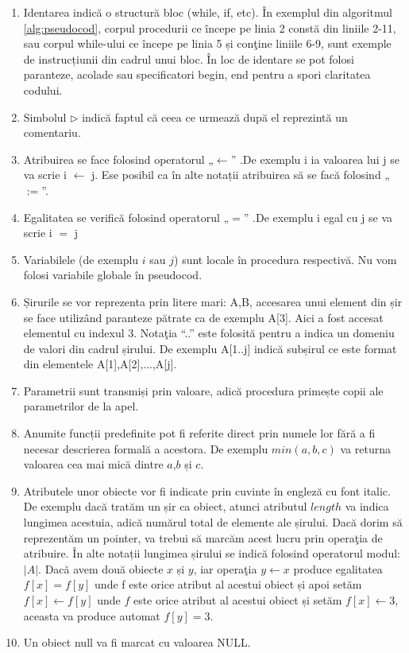 \begin{enumerate}
\item {
	Identarea indică o structură bloc (while, if, etc). În exemplul din algoritmul \ref{alg:pseudocod}, corpul procedurii ce
	începe pe linia 2 constă din liniile 2-11, sau corpul while-ului ce începe pe linia 5 și conţine
	liniile 6-9, sunt exemple de instrucțiunii din cadrul unui bloc.
	În loc de identare se pot folosi paranteze, acolade sau specificatori begin, end pentru a spori claritatea codului.
}
\item {
	Simbolul $\rhd$ indică faptul că ceea ce urmează după el reprezintă un comentariu.
}
\item {
	Atribuirea se face folosind operatorul „$\leftarrow$” .De exemplu i ia valoarea lui j se va scrie i $\leftarrow$ j. Ese posibil ca în alte notații atribuirea să se facă folosind „$:=$”.
}
\item {
	Egalitatea se verifică folosind operatorul „$=$” .De exemplu i egal cu j se va scrie i $=$ j
}
\item {
	Variabilele (de exemplu $i$ sau $j$) sunt locale în procedura respectivă. Nu vom folosi variabile globale în pseudocod.
}
\item {
	Șirurile se vor reprezenta prin litere mari: A,B, accesarea unui element din șir se face utilizând paranteze pătrate ca de exemplu A[3]. Aici a fost accesat elementul cu indexul 3. Notaţia “..” este folosită pentru a indica un domeniu de valori din cadrul șirului. De exemplu A[1..j] indică subșirul ce este format din elementele A[1],A[2],...,A[j].	
}
\item {
	Parametrii sunt transmiși prin valoare, adică procedura primește copii ale parametrilor de la apel.
}
\item {
	Anumite funcții predefinite pot fi referite direct prin numele lor fără a fi necesar descrierea formală a acestora. De exemplu $min(a,b,c)$ va returna valoarea cea mai mică dintre $a$,$b$ și $c$.
}
\item {
	Atributele unor obiecte vor fi indicate prin cuvinte în engleză cu font italic. De exemplu dacă tratăm un șir ca obiect, atunci atributul $length$ va indica lungimea acestuia, adică numărul total de elemente ale șirului. Dacă dorim să reprezentăm un pointer, va trebui să marcăm acest lucru prin operaţia de atribuire. În alte notații lungimea șirului se indică folosind operatorul modul: $|A|$.
	Dacă avem două obiecte $x$ și $y$, iar operaţia $y  \leftarrow x$ produce egalitatea $f[x]=f[y]$ unde f este orice atribut al acestui obiect și apoi setăm $f[x] \leftarrow f[y]$ unde $f$ este orice atribut al acestui obiect și setăm $f[x] \leftarrow 3$, aceasta va produce automat $f[y]=3$.	
}
\item {
	Un obiect null va fi marcat cu valoarea NULL.
}

\end{enumerate}

